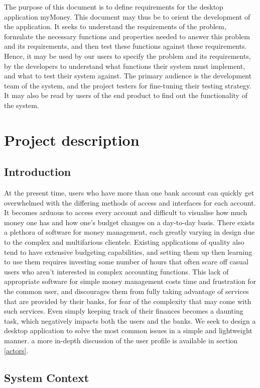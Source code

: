 \documentclass[11pt]{article}
\newcounter{use case ID}
\newcounter{req ID}
\begin{document}
The purpose of this document is to define requirements for the  desktop application myMoney. This document may thus be to orient the development of the application. It seeks to understand the requirements of the problem, formulate the necessary functions and properties needed to answer this problem and its requirements, and then test these functions against these requirements. Hence, it may be used by our users to specify the problem and its requirements, by the developers to understand what functions their system must implement, and what to test their system against. The primary audience is the development team of the system, and the project testers for fine-tuning their testing strategy. It may also be read by users of the end product to find out the functionality of the system.

\section{Project description}

\subsection{Introduction}
At the present time, users who have more than one bank account can quickly get overwhelmed with the differing methods of access and interfaces for each account. It becomes arduous to access every account and difficult to visualise how much money one has and how one's budget changes on a day-to-day basis. There exists a plethora of software for money management, each greatly varying in design due to the complex and multifarious clientele. Existing applications of quality also tend to have extensive budgeting capabilities, and setting them up then learning to use them requires investing some number of hours that often scare off casual users who aren't interested in complex accounting functions. This lack of appropriate software for simple money management costs time and frustration for the common user, and discourages them from fully taking advantage of services that are provided by their banks, for fear of the complexity that may come with such services. Even simply keeping track of their finances becomes a daunting task, which negatively impacts both the users and the banks. We seek to design a desktop application to solve the most common issues in a simple and lightweight manner. a more in-depth discussion of the user profile is available in section \ref{actors}.

\subsection{System Context}
\end{document}
